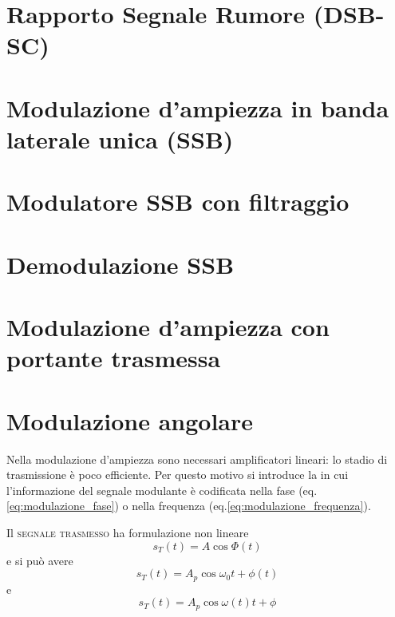 \section{Rapporto Segnale Rumore (DSB-SC)}
\section{Modulazione d'ampiezza in banda laterale unica (SSB)}
\section{Modulatore SSB con filtraggio}
\section{Demodulazione SSB}
\section{Modulazione d'ampiezza con portante trasmessa}

\clearpage
\section{Modulazione angolare}
Nella modulazione d'ampiezza sono necessari amplificatori lineari: lo stadio di trasmissione è poco efficiente. Per questo motivo si introduce la  in cui l'informazione del segnale modulante è codificata nella fase (eq.\ref{eq:modulazione_fase}) o nella frequenza (eq.\ref{eq:modulazione_frequenza}).

Il \textsc{segnale trasmesso} ha formulazione non lineare \[s_T(t)=A\cos{\Phi(t)}\] e si può avere 
\begin{equation}s_T(t)=A_p \cos{\omega_0 t + \phi(t)}\label{eq:modulazione_fase}\end{equation}
e 
\begin{equation}s_T(t)=A_p \cos{\omega(t) t + \phi}\label{eq:modulazione_frequenza}\end{equation}

